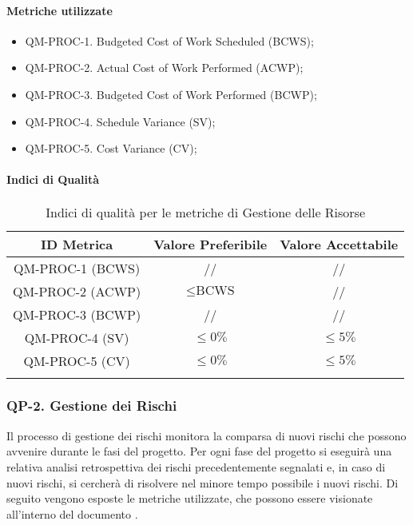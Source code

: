 		\paragraph{Metriche utilizzate}

			\begin{itemize}
				\item QM-PROC-1. Budgeted Cost of Work Scheduled (BCWS);
				\item QM-PROC-2. Actual Cost of Work Performed (ACWP);
				\item QM-PROC-3. Budgeted Cost of Work Performed (BCWP);
				\item QM-PROC-4. Schedule Variance (SV);
				\item QM-PROC-5. Cost Variance (CV);
			\end{itemize}

		\paragraph{Indici di Qualità}

			\begin{center}
				\begin{longtable}{|c|c|c|}
				\hline
				\rowcolor{lighter-grayer}
				\textbf{ID Metrica} & \textbf{Valore Preferibile} & \textbf{Valore Accettabile}\\
				\hline
				\endfirsthead
				\hline
				QM-PROC-1 (BCWS) & // & // \\
				\hline
				QM-PROC-2 (ACWP) & \( \le \text{BCWS}\) & // \\
				\hline
				QM-PROC-3 (BCWP) & // & // \\
				\hline
				QM-PROC-4 (SV) & \(\le 0\%\) & \(\le 5\%\) \\
				\hline
				QM-PROC-5 (CV) & \(\le 0\%\) & \(\le 5\%\) \\
				\hline
				\caption{Indici di qualità per le metriche di Gestione delle Risorse}
				\end{longtable}
			\end{center}


	\subsubsection{QP-2. Gestione dei Rischi}

		Il processo di gestione dei rischi monitora la comparsa di nuovi rischi che possono avvenire durante le fasi del progetto.
		Per ogni fase del progetto si eseguirà una relativa analisi retrospettiva dei rischi precedentemente segnalati e, in caso di nuovi rischi, si cercherà di risolvere nel minore tempo possibile i nuovi rischi.
		Di seguito vengono esposte le metriche utilizzate, che possono essere visionate all'interno del documento . 


